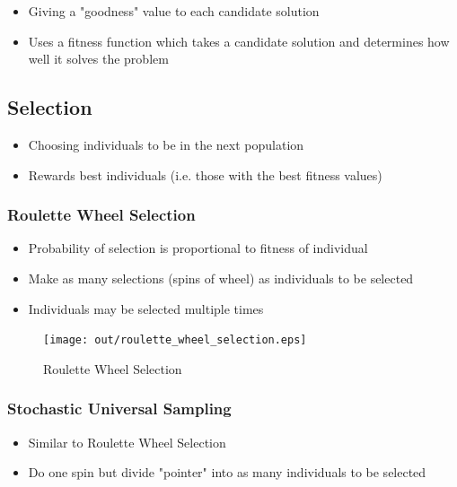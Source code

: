 \documentclass[a4paper]{article}
\begin{document}
\begin{itemize}
  \item Giving a "goodness" value to each candidate solution
  \item Uses a fitness function which takes a candidate solution and determines
        how well it solves the problem
\end{itemize}

\subsection{Selection}

\begin{itemize}
  \item Choosing individuals to be in the next population
  \item Rewards best individuals (i.e. those with the best fitness values)
\end{itemize}

\subsubsection{Roulette Wheel Selection}

\begin{itemize}
  \item Probability of selection is proportional to fitness of individual
  \item Make as many selections (spins of wheel) as individuals to be selected
  \item Individuals may be selected multiple times
\end{itemize}

\begin{figure}[h!]
  \centering
  \texttt{[image: out/roulette\_wheel\_selection.eps]}
  \caption{Roulette Wheel Selection}
  \label{fig:roulette_wheel_selection}
\end{figure}
\FloatBarrier

\subsubsection{Stochastic Universal Sampling}

\begin{itemize}
  \item Similar to Roulette Wheel Selection
  \item Do one spin but divide "pointer" into as many individuals to be selected
\end{itemize}
\end{document}
